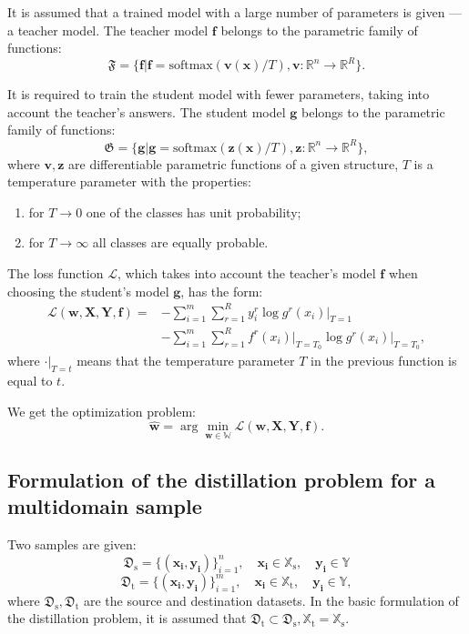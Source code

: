 \documentclass[12pt]{article}
\begin{document}
It is assumed that a trained model with a large number of parameters is given --- a teacher model. The teacher model $\mathbf{f}$ belongs to the parametric family of functions: $$\mathfrak{F}=\{\mathbf{f}|\mathbf{f}=\text{softmax}(\mathbf{v(x)} /T), \mathbf{v}:\mathbb{R}^{n}\rightarrow \mathbb{R}^{R}\}.$$

It is required to train the student model with fewer parameters, taking into account the teacher's answers. The student model $\mathbf{g}$ belongs to the parametric family of functions: $$\mathfrak{G}=\{\mathbf{g}|\mathbf{g}=\text{softmax}(\mathbf{z(x)} /T), \mathbf{z}:\mathbb{R}^{n}\rightarrow \mathbb{R}^{R}\},$$
where $\mathbf{v, z}$ are differentiable parametric functions of a given structure, $T$ is a temperature parameter with the properties:
\begin{enumerate}
     \item for $T \rightarrow 0$ one of the classes has unit probability;
     \item for $T \rightarrow \infty$ all classes are equally probable.
\end{enumerate}

The loss function $\mathcal{L}$, which takes into account the teacher's model $\mathbf{f}$ when choosing the student's model $\mathbf{g}$, has the form:
\[
\begin{aligned}
     \mathcal{L}(\mathbf{w,X,Y,f})=&-\sum\limits_{i=1}^{m}\sum\limits_{r=1}^{R}y_{i }^{r}\log{g^{r}(x_{i})}\bigr|_{T=1}\\
     &-\sum\limits_{i=1}^{m}\sum\limits_{r=1}^{R}f^{r}(x_{i})\bigr|_{T=T_{0} }\log{g^{r}(x_{i})}\bigr|_{T=T_{0}},
\end{aligned}
\]
where $\cdot\bigr|_{T=t}$ means that the temperature parameter $T$ in the previous function is equal to $t$.

We get the optimization problem:
$$\hat{\mathbf{w}} = \arg\min_{\mathbf{w} \in \mathbb{W}} \mathcal{L}(\mathbf{w,X,Y,f}).$$


\subsection{Formulation of the distillation problem for a multidomain sample}

Two samples are given:
$$\mathfrak{D}_{\text{s}}=\{(\mathbf{x_i},\mathbf{y_i})\}_{i=1}^n,
\quad \mathbf{x_i} \in \mathbb{X}_{\text{s}},
\quad \mathbf{y_i} \in \mathbb{Y}$$
$$\mathfrak{D}_{\text{t}}=\{(\mathbf{x_i},\mathbf{y_i})\}_{i=1}^m, \quad \mathbf {x_i} \in \mathbb{X}_{\text{t}},
\quad \mathbf{y_i} \in \mathbb{Y},$$
where $\mathfrak{D}_{\text{s}}, \mathfrak{D}_{\text{t}}$ are the source and destination datasets. In the basic formulation of the distillation problem, it is assumed that
$\mathfrak{D}_{\text{t}} \subset \mathfrak{D}_{\text{s}},
\mathbb{X}_{\text{t}}=\mathbb{X}_{\text{s}}$.
\end{document}
